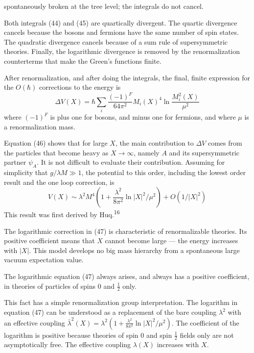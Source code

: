 
spontaneously broken at the tree level; the integrals do not cancel.

Both integrals (44) and (45) are quartically divergent. The
quartic divergence cancels because the bosons and fermions have the
same number of spin states. The quadratic divergence cancels because
of a sum rule of supersymmetric theories. Finally, the logarithmic
divergence is removed by the renormalization counterterms that
make the Green's functions finite.

After renormalization, and after doing the integrals, the final,
finite expression for the $O(\hbar)$ corrections to the energy is
\begin{equation}
\Delta V(X) = \hbar \sum_i \frac{(-1)^F}{64\pi^2} M_i(X)^4 \ln \frac{M_i^2(X)}{\mu^2}
\tag{46}
\end{equation}
where $(-1)^F$ is plus one for bosons, and minus one for fermions, and
where $\mu$ is a renormalization mass.

Equation (46) shows that for large $X$, the main contribution to
$\Delta V$ comes from the particles that become heavy as $X \to \infty$, namely $A$ and
its supersymmetric partner $\psi_A$. It is not difficult to evaluate their
contribution. Assuming for simplicity that $g/\lambda M \gg 1$, the potential
to this order, including the lowest order result and the one loop
correction, is
\begin{equation}
V(X) \sim \lambda^2 M^4 \left(1 + \frac{\lambda^2}{8\pi^2}\ln |X|^2/\mu^2\right) + O(1/|X|^2)
\tag{47}
\end{equation}
This result was first derived by Huq.\textsuperscript{16}

The logarithmic correction in (47) is characteristic of renormalizable
theories. Its positive coefficient means that $X$ cannot
become large --- the energy increases with $|X|$. This model develops
no big mass hierarchy from a spontaneous large vacuum expectation
value.

The logarithmic equation (47) always arises, and always has a
positive coefficient, in theories of particles of spins $0$ and $\frac{1}{2}$ only.

This fact has a simple renormalization group interpretation. The
logarithm in equation (47) can be understood as a replacement of the
bare coupling $\lambda^2$ with an effective coupling $\bar\lambda^2(X) =
\lambda^2 \left(1 + \frac{\lambda^2}{8\pi^2}\ln |X|^2/\mu^2\right)$. The coefficient of the logarithm is positive because theories of spin $0$ and spin $\frac{1}{2}$ fields only are not
asymptotically free. The effective coupling $\lambda(X)$ increases with $X$.

